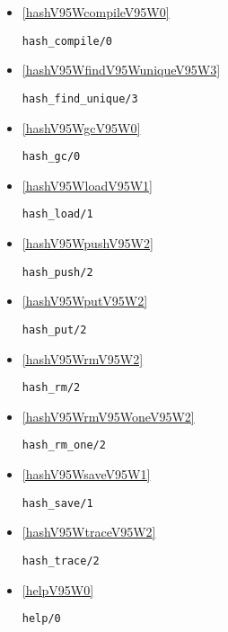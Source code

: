 \begin{itemize}
\item \ref{hashV95WcompileV95W0} 
\begin{verbatim}
hash_compile/0
\end{verbatim}

\item \ref{hashV95WfindV95WuniqueV95W3} 
\begin{verbatim}
hash_find_unique/3
\end{verbatim}

\item \ref{hashV95WgcV95W0} 
\begin{verbatim}
hash_gc/0
\end{verbatim}

\item \ref{hashV95WloadV95W1} 
\begin{verbatim}
hash_load/1
\end{verbatim}

\item \ref{hashV95WpushV95W2} 
\begin{verbatim}
hash_push/2
\end{verbatim}

\item \ref{hashV95WputV95W2} 
\begin{verbatim}
hash_put/2
\end{verbatim}

\item \ref{hashV95WrmV95W2} 
\begin{verbatim}
hash_rm/2
\end{verbatim}

\item \ref{hashV95WrmV95WoneV95W2} 
\begin{verbatim}
hash_rm_one/2
\end{verbatim}

\item \ref{hashV95WsaveV95W1} 
\begin{verbatim}
hash_save/1
\end{verbatim}

\item \ref{hashV95WtraceV95W2} 
\begin{verbatim}
hash_trace/2
\end{verbatim}

\item \ref{helpV95W0} 
\begin{verbatim}
help/0
\end{verbatim}


\end{itemize}
